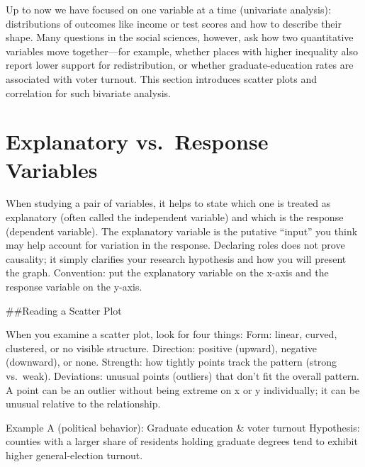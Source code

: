 \documentclass[
  letterpaper,
  DIV=11,
  numbers=noendperiod]{scrreprt}
\begin{document}
Up to now we have focused on one variable at a time (univariate
analysis): distributions of outcomes like income or test scores and how
to describe their shape. Many questions in the social sciences, however,
ask how two quantitative variables move together---for example, whether
places with higher inequality also report lower support for
redistribution, or whether graduate-education rates are associated with
voter turnout. This section introduces scatter plots and correlation for
such bivariate analysis.

\section{Explanatory vs.~Response
Variables}\label{explanatory-vs.-response-variables}

When studying a pair of variables, it helps to state which one is
treated as explanatory (often called the independent variable) and which
is the response (dependent variable). The explanatory variable is the
putative ``input'' you think may help account for variation in the
response. Declaring roles does not prove causality; it simply clarifies
your research hypothesis and how you will present the graph. Convention:
put the explanatory variable on the x-axis and the response variable on
the y-axis.

\#\#Reading a Scatter Plot

When you examine a scatter plot, look for four things: Form: linear,
curved, clustered, or no visible structure. Direction: positive
(upward), negative (downward), or none. Strength: how tightly points
track the pattern (strong vs.~weak). Deviations: unusual points
(outliers) that don't fit the overall pattern. A point can be an outlier
without being extreme on x or y individually; it can be unusual relative
to the relationship.

Example A (political behavior): Graduate education \& voter turnout
Hypothesis: counties with a larger share of residents holding graduate
degrees tend to exhibit higher general-election turnout.
\end{document}
